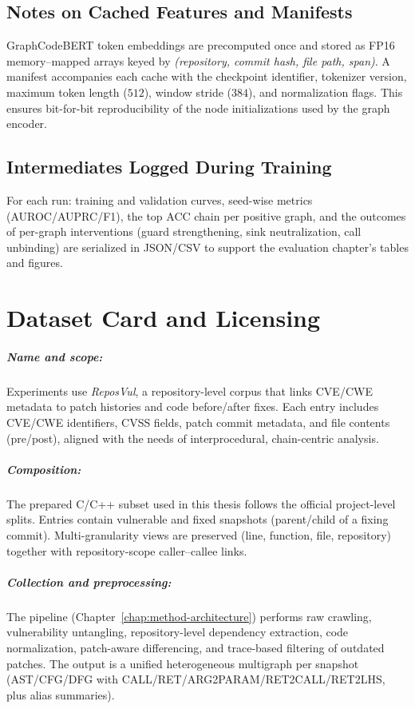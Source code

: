 \documentclass{buthesis}
\begin{document}
\begin{appendices}
\section{Notes on Cached Features and Manifests}
GraphCodeBERT token embeddings are precomputed once and stored as FP16
memory–mapped arrays keyed by \emph{(repository, commit hash, file path, span)}.
A manifest accompanies each cache with the checkpoint identifier, tokenizer
version, maximum token length ($512$), window stride ($384$), and normalization
flags. This ensures bit-for-bit reproducibility of the node initializations used
by the graph encoder.

\section{Intermediates Logged During Training}
For each run: training and validation curves, seed-wise metrics (AUROC/AUPRC/F1),
the top ACC chain per positive graph, and the outcomes of per-graph interventions
(guard strengthening, sink neutralization, call unbinding) are serialized in JSON/CSV
to support the evaluation chapter’s tables and figures.

\chapter{Dataset Card and Licensing}

\paragraph{Name and scope:}
Experiments use \emph{ReposVul}, a repository-level corpus that links CVE/CWE
metadata to patch histories and code before/after fixes. Each entry includes
CVE/CWE identifiers, CVSS fields, patch commit metadata, and file contents
(pre/post), aligned with the needs of interprocedural, chain-centric analysis.

\paragraph{Composition:}
The prepared C/C++ subset used in this thesis follows the official project-level
splits. Entries contain vulnerable and fixed snapshots (parent/child of a fixing
commit). Multi-granularity views are preserved (line, function, file, repository)
together with repository-scope caller–callee links.

\paragraph{Collection and preprocessing:}
The pipeline (Chapter~\ref{chap:method-architecture}) performs raw crawling, vulnerability untangling, repository-level dependency extraction, code
normalization, patch-aware differencing, and trace-based filtering of outdated
patches. The output is a unified heterogeneous multigraph per snapshot (AST/CFG/DFG
with CALL/RET/ARG2PARAM/RET2CALL/RET2LHS, plus alias summaries).


\end{appendices}
\end{document}
